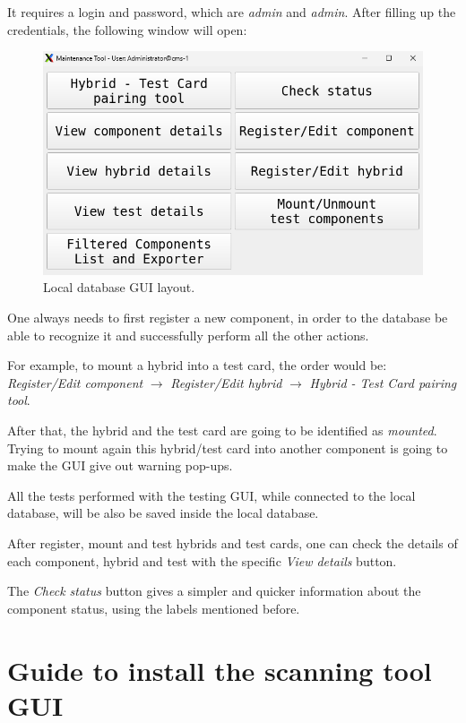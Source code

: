\documentclass[10pt,a4paper]{article}
\begin{document}
It requires a login and password, which are \textit{admin} and \textit{admin}. After filling up the credentials, the following window will open: 

\begin{figure}[!pbth]
\centering
 \includegraphics[width=0.7\linewidth]{Pictures/scanning-GUI.png} 
  \caption{Local database GUI layout.}
  \label{tchau2}
\end{figure}

One always needs to first register a new component, in order to the database be able to recognize it and successfully perform all the other actions.

For example, to mount a hybrid into a test card, the order would be: \textit{Register/Edit component} $\rightarrow$ \textit{Register/Edit hybrid} $\rightarrow$ \textit{Hybrid - Test Card pairing tool}.

After that, the hybrid and the test card are going to be identified as \textit{mounted}. Trying to mount again this hybrid/test card into another component is going to make the GUI give out warning pop-ups. 

All the tests performed with the testing GUI, while connected to the local database, will be also be saved inside the local database.

After register, mount and test hybrids and test cards, one can check the details of each component, hybrid and test with the specific \textit{View details} button.

The \textit{Check status} button gives a simpler and quicker information about the component status, using the labels mentioned before.


\newpage

\appendix

\appendixpage
\section{Guide to install the scanning tool GUI}
\label{installscanner}
\end{document}
